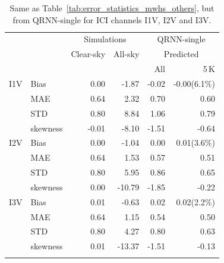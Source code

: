 \documentclass[amt, manuscript]{copernicus}
\begin{document}
\begin{table}[t]
	\caption{ Same as Table~\ref{tab:error_statistics_mwhs_others}, but from QRNN-single for ICI channels I1V, I2V and I3V.}
	\label{tab:error_statistics_ici}
	\begin{tabular}{llrr|rr}
		\tophline
		&&\multicolumn{2}{c|}{Simulations}& \multicolumn{2}{c}{QRNN-single} \\
		\cline{3-6}
		&&Clear-sky &   All-sky &  \multicolumn{2}{c}{Predicted}  \\
		&&			   &			&	All & 5\,K \\
		\middlehline
		
		I1V&  Bias      &  0.00 & -1.87 & -0.02 & -0.00(6.1\%)  \\
		&MAE       &  0.64 &  2.32 &  0.70 &  0.60   \\
		&STD       &  0.80 &  8.84 &  1.06 &  0.79   \\
		&skewness & -0.01 & -8.10 & -1.51 & -0.64  \\
		\middlehline
		I2V & Bias      & 0.00 &  -1.04 &  0.00 &  0.01(3.6\%)  \\
		&MAE       & 0.64 &   1.53 &  0.57 &  0.51 \\
		&STD       & 0.80 &   5.95 &  0.86 &  0.65 \\
		&skewness & 0.00 & -10.79 & -1.85 & -0.22  \\
		\middlehline	
		I3V & Bias      & 0.01 &  -0.63 &  0.02 &  0.02(2.2\%)  \\
		&MAE       & 0.64 &   1.15 &  0.54 &  0.50  \\
		&STD       & 0.80 &   4.27 &  0.80 &  0.63  \\
		&skewness & 0.01 & -13.37 & -1.51 & -0.13  \\
		\bottomhline
	\end{tabular}
	\belowtable{} %
\end{table}
\end{document}
